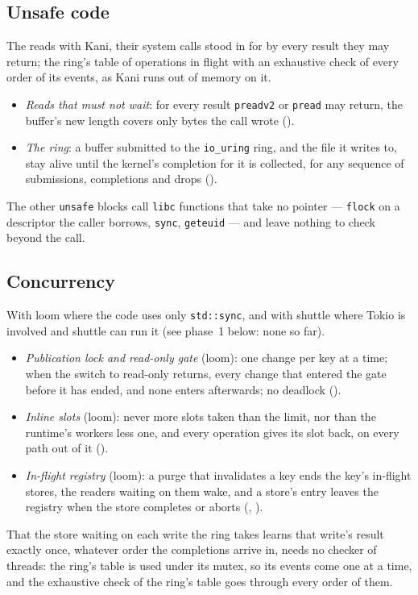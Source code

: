 \subsection{Unsafe code}

The reads with Kani, their system calls stood in for by every result they
may return; the ring's table of operations in flight with an exhaustive
check of every order of its events, as Kani runs out of memory on it.
\begin{itemize}
  \item \emph{Reads that must not wait}: for every result \texttt{preadv2}
    or \texttt{pread} may return, the buffer's new length covers only bytes
    the call wrote ().
  \item \emph{The ring}: a buffer submitted to the \texttt{io\_uring} ring,
    and the file it writes to, stay alive until the kernel's completion for
    it is collected, for any sequence of submissions, completions and drops
    ().
\end{itemize}
The other \texttt{unsafe} blocks call \texttt{libc} functions that take no
pointer --- \texttt{flock} on a descriptor the caller borrows,
\texttt{sync}, \texttt{geteuid} --- and leave nothing to check beyond the
call.

\subsection{Concurrency}

With loom where the code uses only \texttt{std::sync}, and with shuttle where
Tokio is involved and shuttle can run it (see phase~1 below: none so far).
\begin{itemize}
  \item \emph{Publication lock and read-only gate} (loom): one change per key
    at a time; when the switch to read-only returns, every change that
    entered the gate before it has ended, and none enters afterwards; no
    deadlock ().
  \item \emph{Inline slots} (loom): never more slots taken than the limit,
    nor than the runtime's workers less one, and every operation gives its
    slot back, on every path out of it
    ().
  \item \emph{In-flight registry} (loom): a purge that invalidates a key
    ends the key's in-flight stores, the readers waiting on them wake, and a
    store's entry leaves the registry when the store completes or aborts
    (, ).
\end{itemize}
That the store waiting on each write the ring takes learns that write's
result exactly once, whatever order the completions arrive in, needs no
checker of threads: the ring's table is used under its mutex, so its events
come one at a time, and the exhaustive check of the ring's table goes
through every order of them.

